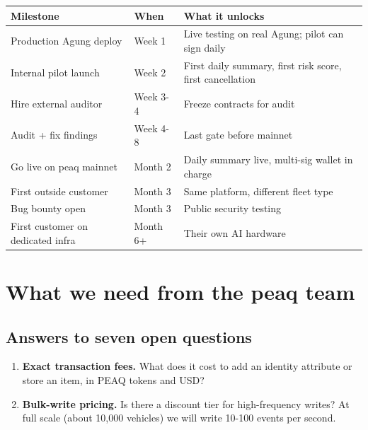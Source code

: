 \documentclass[11pt,a4paper]{article}
\begin{document}
\begin{center}
\begin{tabular}{p{4cm} p{2.4cm} p{8.6cm}}
\toprule
{\bfseries\color{axiprimary}Milestone} & {\bfseries\color{axiprimary}When} & {\bfseries\color{axiprimary}What it unlocks} \\
\midrule
Production Agung deploy & Week 1 & Live testing on real Agung; pilot can sign daily \\
\addlinespace[2pt]
Internal pilot launch & Week 2 & First daily summary, first risk score, first cancellation \\
\addlinespace[2pt]
Hire external auditor & Week 3-4 & Freeze contracts for audit \\
\addlinespace[2pt]
Audit + fix findings & Week 4-8 & Last gate before mainnet \\
\addlinespace[2pt]
Go live on peaq mainnet & Month 2 & Daily summary live, multi-sig wallet in charge \\
\addlinespace[2pt]
First outside customer & Month 3 & Same platform, different fleet type \\
\addlinespace[2pt]
Bug bounty open & Month 3 & Public security testing \\
\addlinespace[2pt]
First customer on dedicated infra & Month 6+ & Their own AI hardware \\
\bottomrule
\end{tabular}
\end{center}

\newpage
\section{What we need from the peaq team}

\subsection{Answers to seven open questions}

\begin{infobox}[title=Cost + capacity]
\begin{enumerate}[leftmargin=*, nosep]
  \item \textbf{Exact transaction fees.} What does it cost to add an identity attribute or store an item, in PEAQ tokens and USD?
  \item \textbf{Bulk-write pricing.} Is there a discount tier for high-frequency writes? At full scale (about 10{,}000 vehicles) we will write 10-100 events per second.
\end{enumerate}
\end{infobox}
\end{document}
